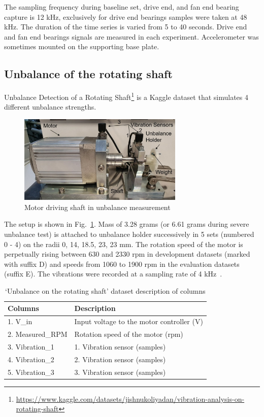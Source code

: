 The sampling frequency during baseline set, drive end, and fan end bearing capture is 12 kHz, exclusively for drive end bearings samples were taken at 48 kHz. The duration of the time series is varied from 5 to 40 seconds. Drive end and fan end bearings signals are measured in each experiment. Accelerometer was sometimes mounted on the supporting base plate.

\subsection{Unbalance of the rotating shaft}
Unbalance Detection of a Rotating Shaft\footnote{\url{https://www.kaggle.com/datasets/jishnukoliyadan/vibration-analysis-on-rotating-shaft}} is a Kaggle dataset that simulates 4 different unbalance strengths. 
\begin{figure}[h]
\centering
\includegraphics[width=0.7\textwidth]{assets/rotating-shaft.jpg}
\caption{Motor driving shaft in unbalance measurement \cite{mey_machine_2020}}
\label{fig:rotating-shaft}
\end{figure}

The setup is shown in Fig.~\ref{fig:rotating-shaft}. Mass of 3.28 grams (or 6.61 grams during severe unbalance test) is attached to unbalance holder successively in 5 sets (numbered 0 - 4) on the radii 0, 14, 18.5, 23, 23 mm. The rotation speed of the motor is perpetually rising between 630 and 2330 rpm in development datasets (marked with suffix D) and speeds from 1060 to 1900 rpm in the evaluation datasets (suffix E). The vibrations were recorded at a sampling rate of 4 kHz~\cite{mey_machine_2020}.

\begin{table}[h]
\centering
\renewcommand{\arraystretch}{1.2}
\begin{tabular}{|l|l|}
\hline
\textbf{Columns} & \textbf{Description}                      \\ \hline
1. V\_in         & Input voltage to the motor controller (V) \\ \hline
2. Measured\_RPM & Rotation speed of the motor (rpm)  \\ \hline
3. Vibration\_1  & 1. Vibration sensor (samples)             \\ \hline
4. Vibration\_2  & 2. Vibration sensor (samples)             \\ \hline
5. Vibration\_3  & 3. Vibration sensor (samples)             \\ \hline
\end{tabular}
\caption{`Unbalance on the rotating shaft' dataset description of columns}
\end{table}


